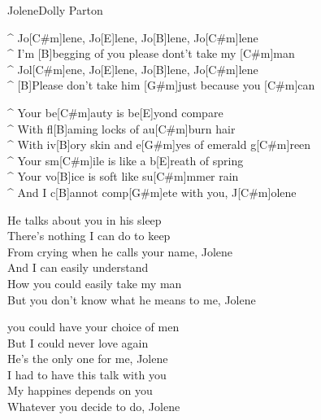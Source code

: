 \begin{song}{Jolene}{Dolly Parton}

\begin{guitar}
^ Jo[C#m]lene, Jo[E]lene, Jo[B]lene, Jo[C#m]lene\\
^ I'm [B]begging of you please dont't take my [C#m]man\\
^ Jol[C#m]ene, Jo[E]lene, Jo[B]lene, Jo[C#m]lene\\
^ [B]Please don't take him [G#m]just because you [C#m]can\\
\end{guitar}

\begin{guitar}
^ Your be[C#m]auty is be[E]yond compare\\
^ With fl[B]aming locks of au[C#m]burn hair\\
^ With iv[B]ory skin and e[G#m]yes of emerald g[C#m]reen\\
^ Your sm[C#m]ile is like a b[E]reath of spring\\
^ Your vo[B]ice is soft like su[C#m]mmer rain\\
^ And I c[B]annot comp[G#m]ete with you, J[C#m]olene\\
\end{guitar}

\begin{guitar}
He talks about you in his sleep\\
There's nothing I can do to keep\\
From crying when he calls your name, Jolene\\
And I can easily understand \\
How you could easily take my man\\
But you don't know what he means to me, Jolene\\
\end{guitar}


\begin{guitar}
you could have your choice of men\\
But I could never love again\\
He's the only one for me, Jolene\\
I had to have this talk with you \\
My happines depends on you\\
Whatever you decide to do, Jolene\\
\end{guitar}


\end{song}
